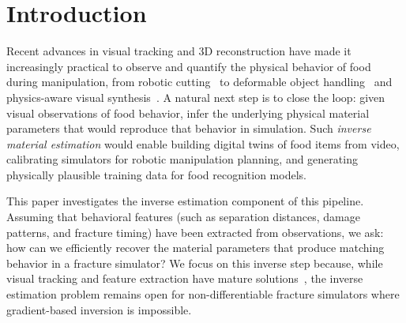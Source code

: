 \section{Introduction}
\label{sec:intro}


Recent advances in visual tracking and 3D reconstruction have made it increasingly practical to observe and quantify the physical behavior of food during manipulation, from robotic cutting~\cite{heiden2021disect, xu2023roboninja, beltran2024sliceit} to deformable object handling~\cite{shi2023robocook} and physics-aware visual synthesis~\cite{wu2025fruitninja, xie2024physgaussian}. A natural next step is to close the loop: given visual observations of food behavior, infer the underlying physical material parameters that would reproduce that behavior in simulation. Such \emph{inverse material estimation} would enable building digital twins of food items from video, calibrating simulators for robotic manipulation planning, and generating physically plausible training data for food recognition models.

This paper investigates the inverse estimation component of this pipeline. Assuming that behavioral features (such as separation distances, damage patterns, and fracture timing) have been extracted from observations, we ask: how can we efficiently recover the material parameters that produce matching behavior in a fracture simulator? We focus on this inverse step because, while visual tracking and feature extraction have mature solutions~\cite{wu2025fruitninja}, the inverse estimation problem remains open for non-differentiable fracture simulators where gradient-based inversion is impossible.


